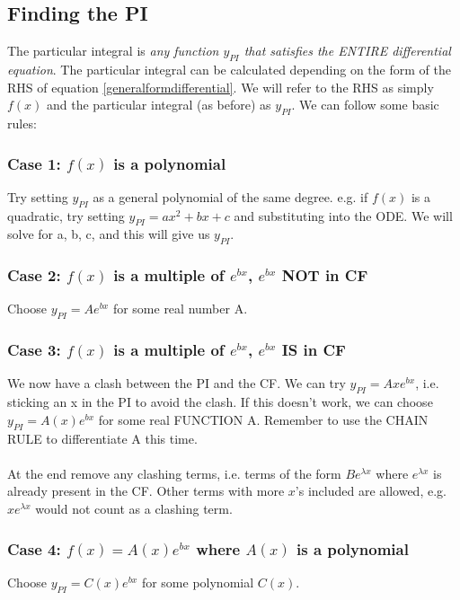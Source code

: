 \documentclass{scrartcl}
\begin{document}
\subsection{Finding the PI}
The particular integral is \emph{any function $ y_{PI} $ that satisfies the ENTIRE differential equation}. The particular integral can be calculated depending on the form of the RHS of equation \ref{generalformdifferential}. We will refer to the RHS as simply $ f(x) $ and the particular integral (as before) as $ y_{PI} $. We can follow some basic rules:


\subsubsection*{Case 1: $ f(x) $ is a polynomial}
Try setting $ y_{PI} $ as a general polynomial of the same degree. e.g. if $ f(x) $ is a quadratic, try setting $ y_{PI} = ax^{2} + bx + c $ and substituting into the ODE. We will solve for a, b, c, and this will give us $ y_{PI} $.

\subsubsection*{Case 2: $ f(x) $ is a multiple of $ e^{bx} $, $ e^{bx} $ NOT in CF}
Choose $ y_{PI} = Ae^{bx} $ for some real number A.

\subsubsection*{Case 3: $ f(x) $ is a multiple of $ e^{bx} $, $ e^{bx} $ IS in CF}
We now have a clash between the PI and the CF. We can try $ y_{PI} = Axe^{bx} $, i.e. sticking an x in the PI to avoid the clash. If this doesn't work, we can choose $ y_{PI} = A(x)e^{bx} $ for some real FUNCTION A. Remember to use the CHAIN RULE to differentiate A this time.
\\\\
At the end remove any clashing terms, i.e. terms of the form $ Be^{\lambda x} $ where $ e^{\lambda x} $ is already present in the CF. Other terms with more $ x $'s included are allowed, e.g. $ xe^{\lambda x} $ would not count as a clashing term.

\subsubsection*{Case 4: $ f(x) = A(x)e^{bx} $ where $ A(x) $ is a polynomial}
Choose $ y_{PI} = C(x)e^{bx} $ for some polynomial $ C(x) $.
\end{document}
